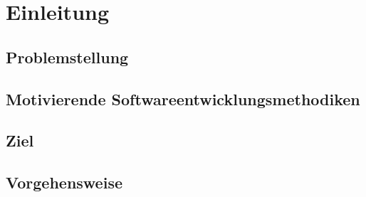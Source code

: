 \section{Einleitung}

\subsection{Problemstellung}

\subsection{Motivierende Softwareentwicklungsmethodiken}

\subsection{Ziel}

\subsection{Vorgehensweise}
